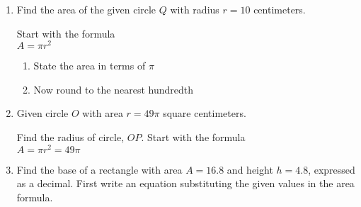 \documentclass[12pt, twoside]{article}
\begin{document}
\begin{enumerate}
\newpage
\item Find the area of the given circle $Q$ with radius $r=10$ centimeters.
  \begin{multicols}{2}
  \raggedcolumns
  Start with the formula\\[0.5cm]
  $A = \pi r^2$ 
  \begin{enumerate}
    \item State the area in terms of $\pi$ \vspace{1.7cm}
    \item Now round to the nearest hundredth
  \end{enumerate}

  \end{multicols}

\newpage
\item Given circle $O$ with area $r=49 \pi$ square centimeters.
  \begin{multicols}{2}
  \raggedcolumns
  Find the radius of circle, $OP$. Start with the formula\\[0.5cm]
  $A = \pi r^2 = 49 \pi$ \vspace{1.7cm}

  \end{multicols}

\newpage
\item Find the base of a rectangle with area $A=16.8$ and height $h=4.8$, expressed as a decimal. First write an equation substituting the given values in the area formula.
  \begin{flushright}
  \end{flushright}


\end{enumerate}
\end{document}
